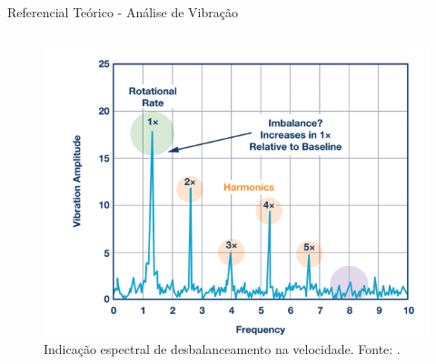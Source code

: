 \documentclass[aspectratio=169]{beamer}
\begin{document}
\begin{frame}{Referencial Teórico - Análise de Vibração}
\begin{columns}
		\begin{column}{0.5\textwidth}
			\begin{figure}[HT]
				\begin{center}
					\captionsetup{justification=justified}
					\includegraphics[scale=.25]{../referencial/img/imbalance_analog_p2.png}
					\caption{Indicação espectral de desbalanceamento na velocidade. \newline
					Fonte: .} 
					\label{fig:imbalance_analog_p2}
				\end{center}
			\end{figure}
	 	\end{column}
	 \end{columns}
\end{frame}

\end{document}
